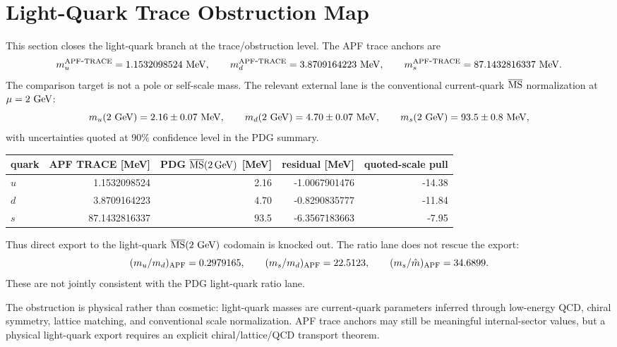 
\section{Light-Quark Trace Obstruction Map}\label{sec:light-quark-obstruction-map}

This section closes the light-quark branch at the trace/obstruction level.  The APF trace anchors are
\[
 m_u^{\rm APF\mbox{-}TRACE}=1.1532098524~{\rm MeV},\qquad
 m_d^{\rm APF\mbox{-}TRACE}=3.8709164223~{\rm MeV},\qquad
 m_s^{\rm APF\mbox{-}TRACE}=87.1432816337~{\rm MeV}.
\]
The comparison target is not a pole or self-scale mass.  The relevant external lane is the conventional current-quark
\(\overline{\rm MS}\) normalization at \(\mu=2~{\rm GeV}\):
\[
 m_u(2~{\rm GeV})=2.16\pm0.07~{\rm MeV},\qquad
 m_d(2~{\rm GeV})=4.70\pm0.07~{\rm MeV},\qquad
 m_s(2~{\rm GeV})=93.5\pm0.8~{\rm MeV},
\]
with uncertainties quoted at 90\% confidence level in the PDG summary.

\begin{center}
\begin{tabular}{lrrrr}
\hline
quark & APF TRACE [MeV] & PDG \(\overline{\rm MS}(2\,{\rm GeV})\) [MeV] & residual [MeV] & quoted-scale pull \\
\hline
\(u\) & 1.1532098524 & 2.16 & -1.0067901476 & -14.38 \\
\(d\) & 3.8709164223 & 4.70 & -0.8290835777 & -11.84 \\
\(s\) & 87.1432816337 & 93.5 & -6.3567183663 & -7.95 \\
\hline
\end{tabular}
\end{center}

Thus direct export to the light-quark \(\overline{\rm MS}(2~{\rm GeV})\) codomain is knocked out.  The ratio lane does not rescue the export:
\[
 (m_u/m_d)_{\rm APF}=0.2979165,\qquad (m_s/m_d)_{\rm APF}=22.5123,
\qquad (m_s/\hat m)_{\rm APF}=34.6899.
\]
These are not jointly consistent with the PDG light-quark ratio lane.

\begin{center}
\end{center}

The obstruction is physical rather than cosmetic: light-quark masses are current-quark parameters inferred through low-energy QCD, chiral symmetry, lattice matching, and conventional scale normalization.  APF trace anchors may still be meaningful internal-sector values, but a physical light-quark export requires an explicit chiral/lattice/QCD transport theorem.
